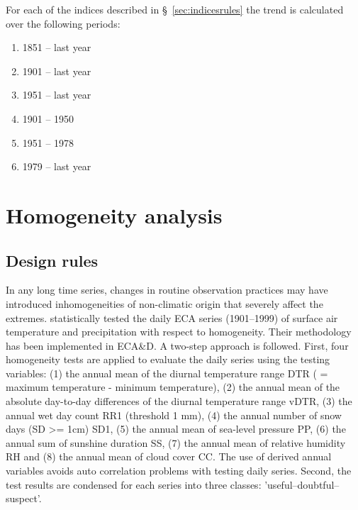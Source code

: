 \documentclass[a4paper,11pt]{article}
\begin{document}
For each of the indices described in \S~\ref{sec:indicesrules} the trend is calculated over the following periods:

\begin{enumerate}
\item 1851 -- last year
\item 1901 -- last year
\item 1951 -- last year
\item 1901 -- 1950
\item 1951 -- 1978
\item 1979 -- last year
\end{enumerate}


\section{Homogeneity analysis}
\label{sec:homo}
\subsection{Design rules}
\label{sec:homorules}

In any long time series, changes in routine observation practices may
have introduced inhomogeneities of non-climatic origin that severely
affect the extremes. \citet{wijngaard} statistically tested the daily
ECA series (1901--1999) of surface air temperature and precipitation
with respect to homogeneity. Their methodology has been implemented in
ECA\&D. A two-step approach is followed. First, four homogeneity tests
are applied to evaluate the daily series using the testing variables:
(1) the annual mean of the diurnal temperature range DTR ( = maximum
temperature - minimum temperature), (2) the annual mean of the
absolute day-to-day differences of the diurnal temperature range vDTR,
(3) the annual wet day count RR1 (threshold 1 mm), (4) the annual number 
of snow days (SD >= 1cm) SD1, (5) the annual mean of sea-level pressure PP, 
(6) the annual sum of sunshine duration SS, (7) the annual mean of relative
humidity RH and (8) the annual mean of cloud cover CC. The use of
derived annual variables avoids auto correlation problems with testing
daily series. Second, the test results are condensed for each series
into three classes: 'useful--doubtful--suspect'.
\end{document}
